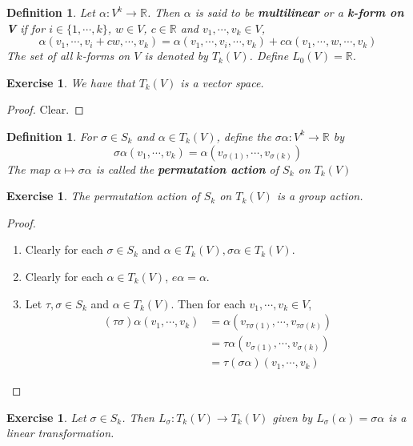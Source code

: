 \documentclass[12pt]{amsart}
\newtheorem{defn}[thm]{Definition}
\newtheorem{ex}[thm]{Exercise}
\newcommand{\al}{\alpha}
\newcommand{\sig}{\sigma}
\newcommand{\R}{\mathbb{R}}
\begin{document}
	\begin{defn}
		Let $\al: V^k \rightarrow \R$. Then $\alpha$ is said to be \textbf{multilinear} or a \textbf{k-form on V} if for $i \in \{1, \cdots, k\}$, $w \in V$, $c \in \R$ and $v_1, \cdots, v_k \in V$, $$\al(v_1, \cdots, v_i + cw, \cdots, v_k) = \al(v_1, \cdots, v_i, \cdots, v_k) + c\al(v_1, \cdots, w, \cdots, v_k)$$
		The set of all $k$-forms on $V$ is denoted by $T_k(V)$. Define $L_0(V) = \R$.
	\end{defn}

	\begin{ex}
		We have that $T_k(V)$ is a vector space. 
	\end{ex}

	\begin{proof}
		Clear.
	\end{proof}

	\begin{defn}
		For $\sig \in S_k$ and $\al \in T_k(V)$, define the $\sig \al : V^k \rightarrow \R$ by $$\sig \al(v_1, \cdots, v_k) = \al(v_{\sig(1)}, \cdots, v_{\sig(k)})$$  The map $\al \mapsto \sig \al$ is called the \textbf{permutation action} of $S_k$ on $T_k(V)$
	\end{defn}

	\begin{ex}
		The permutation action of $S_k$ on $T_k(V)$ is a group action.
	\end{ex}

	\begin{proof} \
		\begin{enumerate}
			\item Clearly for each $\sig \in S_k$ and $\al \in T_k(V), \sig \al \in T_k(V) $.
			\item Clearly for each $\al \in T_k(V)$, $e \al = \al$.
			\item Let $\tau, \sig \in S_k$ and $\al \in T_k(V)$. Then for each $v_1, \cdots, v_k \in V$, 
			\begin{align*}
				(\tau \sig) \al(v_1, \cdots, v_k) 
				&= \al(v_{\tau \sig (1)}, \cdots, v_{\tau \sig (k)}) \\
				&= \tau \al(v_{ \sig (1)}, \cdots, v_{ \sig (k)}) \\ 
				&= \tau (\sig \al) (v_1, \cdots, v_k) 
			\end{align*}
		\end{enumerate}
	\end{proof}

	\begin{ex}
		Let $\sig \in S_k$. Then $L_{\sig}: T_k(V) \rightarrow T_k(V)$ given by $ L_{\sig}(\al) = \sig \al$ is a linear transformation.
	\end{ex}
\end{document}
